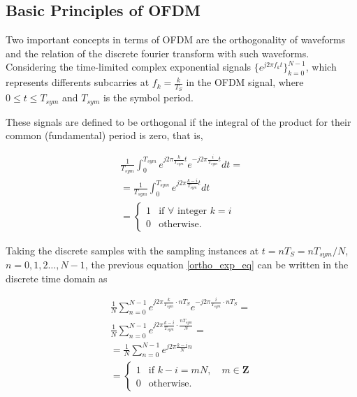 \subsection{Basic Principles of OFDM}

\par Two important concepts in terms of OFDM are the orthogonality of waveforms and the relation of the discrete fourier transform with such waveforms. Considering the time-limited complex exponential signals $\{e^{j2\pi f_k t}\}^{N -1}_{k = 0}$, which represents differents subcarries at $f_k = \frac{k}{T_S}$ in the OFDM signal, where $0 \leq t \leq T_{sym}$ and $T_{sym}$ is the symbol period.

\par These signals are defined to be orthogonal if the integral of the product for their common (fundamental) period is zero, that is,


\begin{equation} \label{ortho_exp_eq}
\begin{split}
 \frac{1}{T_{sym}}\int_{0}^{T_{sym}} e^{j2\pi\frac{k}{T_{sym}}t}e^{-j2\pi\frac{i}{T_{sym}}t}dt = \\
 = \frac{1}{T_{sym}}\int_{0}^{T_{sym}} e^{j2\pi\frac{k-i}{T_{sym}}t}dt \\
    = \left\{
	\begin{array}{ll}
		1  & \mbox{if } \forall \mbox{ integer } k = i \\
		0  & \mbox{otherwise. } 
	\end{array}
    \right.
\end{split}
\end{equation}

\par Taking the discrete samples with the sampling instances at $t = n T_S = n T_{sym}/ N$, $n = 0, 1, 2 \ldots, N-1$, the previous equation \ref{ortho_exp_eq} can be written in the discrete time domain as

\begin{equation} \label{exp_td_eq}
\begin{split}
 \frac{1}{N}\sum_{n =0}^{N-1} e^{j2\pi\frac{k}{T_{sym}}\cdot n T_S}e^{-j2\pi\frac{i}{T_{sym}}\cdot n T_S} = \\
  \frac{1}{N}\sum_{n =0}^{N-1} e^{j2\pi\frac{k-i}{T_{sym}}\cdot \frac{nT_{sym}}{N}} = \\
 = \frac{1}{N}\sum_{n =0}^{N-1}
 e^{j2\pi\frac{k-i}{N}n} \\
 = \left\{
	\begin{array}{ll}
		1  & \mbox{if } k-i = mN,  \quad m \in \mathbf{Z} \\
		0  & \mbox{otherwise. } 
	\end{array}
    \right.
\end{split}
\end{equation}
   
